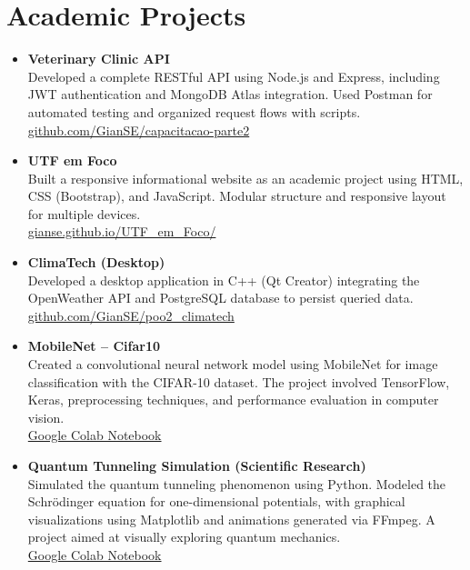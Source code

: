 \documentclass[a4paper,10pt]{article}
\begin{document}
\section*{Academic Projects}
\begin{itemize}[leftmargin=*]
    \item \textbf{Veterinary Clinic API} \\
    Developed a complete RESTful API using Node.js and Express, including JWT authentication and MongoDB Atlas integration. Used Postman for automated testing and organized request flows with scripts.\\  
    \href{https://github.com/GianSE/capacitacao-parte2}{github.com/GianSE/capacitacao-parte2}

    \item \textbf{UTF em Foco} \\
    Built a responsive informational website as an academic project using HTML, CSS (Bootstrap), and JavaScript. Modular structure and responsive layout for multiple devices.\\  
    \href{https://gianse.github.io/UTF_em_Foco/}{gianse.github.io/UTF_em_Foco/}

    \item \textbf{ClimaTech (Desktop)} \\
    Developed a desktop application in C++ (Qt Creator) integrating the OpenWeather API and PostgreSQL database to persist queried data.\\
    \href{https://github.com/GianSE/poo2_climatech}{github.com/GianSE/poo2_climatech}

    \item \textbf{MobileNet – Cifar10} \\
    Created a convolutional neural network model using MobileNet for image classification with the CIFAR-10 dataset. The project involved TensorFlow, Keras, preprocessing techniques, and performance evaluation in computer vision.\\    
    \href{https://colab.research.google.com/drive/1AGP831WCSEpkeN7zi-tSyno52o2E8LfE}{Google Colab Notebook}

    \item \textbf{Quantum Tunneling Simulation (Scientific Research)} \\
    Simulated the quantum tunneling phenomenon using Python. Modeled the Schrödinger equation for one-dimensional potentials, with graphical visualizations using Matplotlib and animations generated via FFmpeg. A project aimed at visually exploring quantum mechanics.\\  
    \href{https://colab.research.google.com/drive/122zQ2S9tb0PJ_tqczK8SwqvF77C_w4Md?usp=sharing}{Google Colab Notebook}
\end{itemize}
\end{document}
